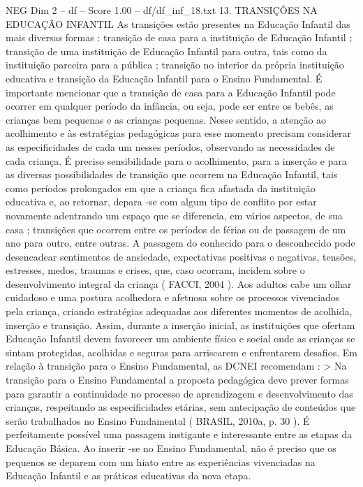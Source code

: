 \begin{textsample}{NEG Dim 2 – df – Score 1.00 – df/df\_inf\_18.txt}  \label{ex:f2_neg_164}
13.
TRANSIÇÕES NA EDUCAÇÃO INFANTIL As transições estão presentes na Educação Infantil das mais diversas formas : transição de casa para a instituição de Educação Infantil ; transição de uma instituição de Educação Infantil para outra, tais como da instituição parceira para a pública ; transição no interior da própria instituição educativa e transição da Educação Infantil para o Ensino Fundamental.
É importante mencionar que a transição de casa para a Educação Infantil pode ocorrer em qualquer período da infância, ou seja, pode ser entre os bebês, as crianças bem pequenas e as crianças pequenas.
Nesse sentido, a atenção ao acolhimento e às estratégias pedagógicas para esse momento precisam considerar as especificidades de cada um nesses períodos, observando as necessidades de cada criança.
É preciso sensibilidade para o acolhimento, para a inserção e para as diversas possibilidades de transição que ocorrem na Educação Infantil, tais como períodos prolongados em que a criança fica afastada da instituição educativa e, ao retornar, depara -se com algum tipo de conflito por estar novamente adentrando um espaço que se diferencia, em vários aspectos, de sua casa ; transições que ocorrem entre os períodos de férias ou de passagem de um ano para outro, entre outras.
A passagem do conhecido para o desconhecido pode desencadear sentimentos de ansiedade, expectativas positivas e negativas, tensões, estresses, medos, traumas e crises, que, caso ocorram, incidem sobre o desenvolvimento integral da criança ( FACCI, 2004 ).
Aos adultos cabe um olhar cuidadoso e uma postura acolhedora e afetuosa sobre os processos vivenciados pela criança, criando estratégias adequadas aos diferentes momentos de acolhida, inserção e transição.
Assim, durante a inserção inicial, as instituições que ofertam Educação Infantil devem favorecer um ambiente físico e social onde as crianças se sintam protegidas, acolhidas e seguras para arriscarem e enfrentarem desafios.
Em relação à transição para o Ensino Fundamental, as DCNEI recomendam : > Na transição para o Ensino Fundamental a proposta pedagógica deve prever formas para garantir a continuidade no processo de aprendizagem e desenvolvimento das crianças, respeitando as especificidades etárias, sem antecipação de conteúdos que serão trabalhados no Ensino Fundamental ( BRASIL, 2010a, p. 30 ).
É perfeitamente possível uma passagem instigante e interessante entre as etapas da Educação Básica.
Ao inserir -se no Ensino Fundamental, não é preciso que os pequenos se deparem com um hiato entre as experiências vivenciadas na Educação Infantil e as práticas educativas da nova etapa.

\end{textsample}
